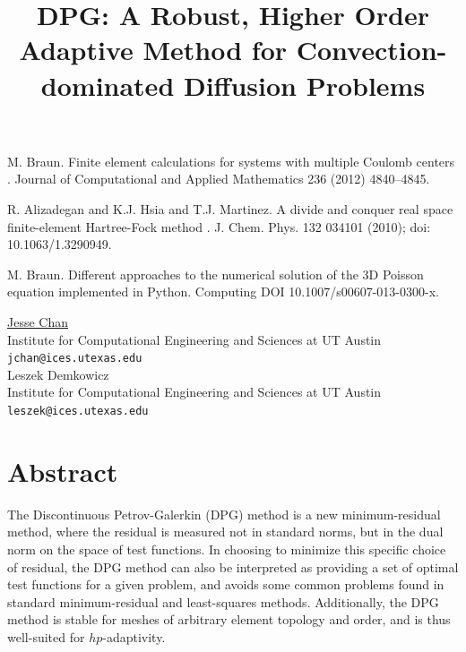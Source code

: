 \documentclass[article, A4, 11pt]{llncs}%
\begin{document}

\begin{thebibliography}{10}
{\sc M. Braun}. { Finite element calculations for systems with multiple Coulomb centers }. Journal of Computational and Applied Mathematics 236 (2012) 4840–4845.

{\sc R. Alizadegan and K.J. Hsia and T.J. Martinez}. {A divide and conquer real space finite-element Hartree-Fock method }. J. Chem. Phys. 132 034101 (2010); doi: 10.1063/1.3290949.

{\sc M. Braun}. {Different approaches to the numerical solution of the 3D Poisson equation implemented in Python}. Computing DOI 10.1007/s00607-013-0300-x.
\end{thebibliography} %

\title{DPG: A Robust, Higher Order Adaptive Method for Convection-dominated Diffusion Problems}
 \author{} \institute{}
\maketitle
\begin{center}
{\large \underline{Jesse Chan}}\\
Institute for Computational Engineering and Sciences at UT Austin\\
{\tt jchan@ices.utexas.edu}
\\ \vspace{4mm}
{\large Leszek  Demkowicz}\\
Institute for Computational Engineering and Sciences at UT Austin\\
{\tt leszek@ices.utexas.edu}
\end{center}

\section*{Abstract}
The Discontinuous Petrov-Galerkin (DPG) method is a new minimum-residual method, where the residual is measured not in standard norms, but in the dual norm on the space of test functions.  In choosing to minimize this specific choice of residual, the DPG method can also be interpreted as providing a set of optimal test functions for a given problem, and avoids some common problems found in standard minimum-residual and least-squares methods.  Additionally, the DPG method is stable for meshes of arbitrary element topology and order, and is thus well-suited for $hp$-adaptivity.  
\end{document}
